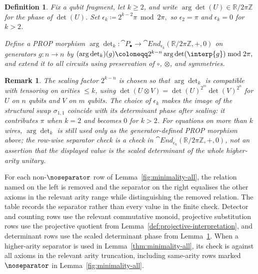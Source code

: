 \documentclass[10pt,a4paper]{article}
\newtheorem{definition}[theorem]{Definition}
\newtheorem{remark}[theorem]{Remark}
\def\cref#1{Lemma~\ref{#1}}%
\begin{document}
\begin{definition}\label{def:argdetk}
Fix a qubit fragment, let \(k\ge 2\), and write \(\arg\det(U)\in\mathbb{R}/2\pi\mathbb{Z}\) for the
phase of \(\det(U)\).  Set
\(
  \epsilon_k\coloneqq 2^{k-2}\pi \bmod 2\pi,
\)
so \(\epsilon_2=\pi\) and \(\epsilon_k=0\) for \(k>2\).

Define a PROP morphism
\(
  \arg\det_k:\cat{P}_\bullet\to \cat{End}_{\epsilon_k}(\mathbb{R}/2\pi\mathbb{Z},+,0)
\)
on generators \(g:n\to n\) by
\(
  (\arg\det_k)(g)\coloneqq 2^{k-n}\arg\det(\interp{g}) \bmod 2\pi,
\)
and extend it to all circuits using preservation of \(\circ\), \(\otimes\), and symmetries.
\end{definition}

\begin{remark}
The scaling factor \(2^{k-n}\) is chosen so that \(\arg\det_k\) is compatible with tensoring on
arities \(\le k\), using \(\det(U\otimes V)=\det(U)^{2^m}\det(V)^{2^n}\) for \(U\) on \(n\) qubits and \(V\)
on \(m\) qubits.  The choice of \(\epsilon_k\) makes the image of the structural swap
\(\sigma_{1,1}\) coincide with its determinant phase after scaling: it contributes \(\pi\) when \(k=2\)
and becomes \(0\) for \(k>2\).
For equations on more than \(k\) wires, \(\arg\det_k\) is still used only as the generator-defined
PROP morphism above; the row-wise separator check is a check in
\(\cat{End}_{\epsilon_k}(\mathbb{R}/2\pi\mathbb{Z},+,0)\), not an assertion that the displayed
value is the scaled determinant of the whole higher-arity unitary.
\end{remark}

For each non-\(\noseparator\) row of \cref{fig:minimality-all}, the relation named on the left is
removed and the separator on the right equalises the other axioms in the relevant arity range while
distinguishing the removed relation.  The table records the separator rather than every value in the
finite check.  Detector and counting rows use the relevant commutative monoid,
projective substitution rows use the projective quotient from \cref{def:projective-interpretation},
and determinant rows use the scaled determinant phase from \cref{def:argdetk}.  When a higher-arity
separator is used in \cref{thm:minimality-all}, its check is against all axioms in the relevant arity
truncation, including same-arity rows marked \(\noseparator\) in \cref{fig:minimality-all}.
\end{document}
